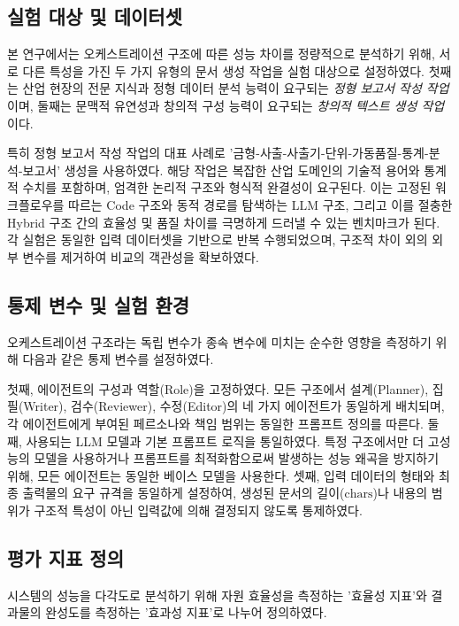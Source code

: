 \subsection{실험 대상 및 데이터셋}
본 연구에서는 오케스트레이션 구조에 따른 성능 차이를 정량적으로 분석하기 위해, 서로 다른 특성을 가진 두 가지 유형의 문서 생성 작업을 실험 대상으로 설정하였다. 첫째는 산업 현장의 전문 지식과 정형 데이터 분석 능력이 요구되는 \textit{정형 보고서 작성 작업}이며, 둘째는 문맥적 유연성과 창의적 구성 능력이 요구되는 \textit{창의적 텍스트 생성 작업}이다.

특히 정형 보고서 작성 작업의 대표 사례로 '금형-사출-사출기-단위-가동품질-통계-분석-보고서' 생성을 사용하였다. 해당 작업은 복잡한 산업 도메인의 기술적 용어와 통계적 수치를 포함하며, 엄격한 논리적 구조와 형식적 완결성이 요구된다. 이는 고정된 워크플로우를 따르는 Code 구조와 동적 경로를 탐색하는 LLM 구조, 그리고 이를 절충한 Hybrid 구조 간의 효율성 및 품질 차이를 극명하게 드러낼 수 있는 벤치마크가 된다. 각 실험은 동일한 입력 데이터셋을 기반으로 반복 수행되었으며, 구조적 차이 외의 외부 변수를 제거하여 비교의 객관성을 확보하였다.

\subsection{통제 변수 및 실험 환경}
오케스트레이션 구조라는 독립 변수가 종속 변수에 미치는 순수한 영향을 측정하기 위해 다음과 같은 통제 변수를 설정하였다.

첫째, 에이전트의 구성과 역할(Role)을 고정하였다. 모든 구조에서 설계(Planner), 집필(Writer), 검수(Reviewer), 수정(Editor)의 네 가지 에이전트가 동일하게 배치되며, 각 에이전트에게 부여된 페르소나와 책임 범위는 동일한 프롬프트 정의를 따른다. 둘째, 사용되는 LLM 모델과 기본 프롬프트 로직을 통일하였다. 특정 구조에서만 더 고성능의 모델을 사용하거나 프롬프트를 최적화함으로써 발생하는 성능 왜곡을 방지하기 위해, 모든 에이전트는 동일한 베이스 모델을 사용한다. 셋째, 입력 데이터의 형태와 최종 출력물의 요구 규격을 동일하게 설정하여, 생성된 문서의 길이($\text{chars}$)나 내용의 범위가 구조적 특성이 아닌 입력값에 의해 결정되지 않도록 통제하였다.

\subsection{평가 지표 정의}
시스템의 성능을 다각도로 분석하기 위해 자원 효율성을 측정하는 '효율성 지표'와 결과물의 완성도를 측정하는 '효과성 지표'로 나누어 정의하였다.

